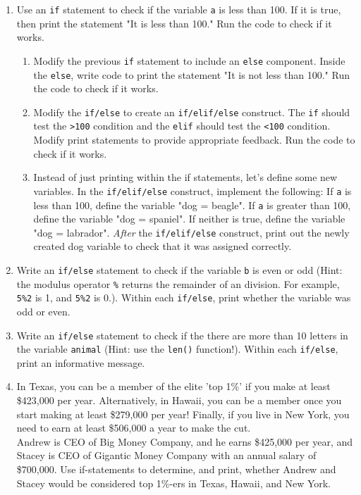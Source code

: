 \documentclass{article}[12pt]
\newcommand{\code}[1]{\texttt{#1}}  %
\begin{document}
\begin{enumerate}
	\item Use an \code{if} statement to check if the variable \code{a} is less than 100. If it is true, then print the statement "It is less than 100." Run the code to check if it works.
	    \begin{enumerate}
            \item Modify the previous \code{if} statement to include an \code{else} component. Inside the \code{else}, write code to print the statement "It is not less than 100." Run the code to check if it works.
            \item Modify the \code{if/else} to create an \code{if/elif/else} construct. The \code{if} should test the \code{>100} condition and the \code{elif} should test the \code{<100} condition. Modify print statements to provide appropriate feedback. Run the code to check if it works.
            \item Instead of just printing within the if statements, let's define some new variables. In the \code{if/elif/else} construct, implement the following: If \code{a} is less than 100, define the variable "dog = beagle". If \code{a} is greater than 100, define the variable "dog = spaniel". If neither is true, define the variable "dog = labrador". \emph{After} the \code{if/elif/else} construct, print out the newly created dog variable to check that it was assigned correctly.
        \end{enumerate}  
    
    \item Write an \code{if/else} statement to check if the variable \code{b} is even or odd (Hint: the modulus operator \code{\%} returns the remainder of an division. For example, \code{5\%2} is 1, and \code{5\%2} is 0.). Within each \code{if/else}, print whether the variable was odd or even.        

    \item Write an \code{if/else} statement to check if the there are more than 10 letters in the variable \code{animal} (Hint: use the \code{len()} function!). Within each \code{if/else}, print an informative message.    
    
	\item In Texas, you can be a member of the elite 'top 1\%' if you make at least \$423,000 per year. Alternatively, in Hawaii, you can be a member once you start making at least \$279,000 per year! Finally, if you live in New York, you need to earn at least \$506,000 a year to make the cut. \\ Andrew is CEO of Big Money Company, and he earns \$425,000 per year, and Stacey is CEO of Gigantic Money Company with an annual salary of \$700,000. Use if-statements to determine, and print, whether Andrew and Stacey would be considered top 1\%-ers in Texas, Hawaii, and New York. \\ 
	

\end{enumerate}
\end{document}
